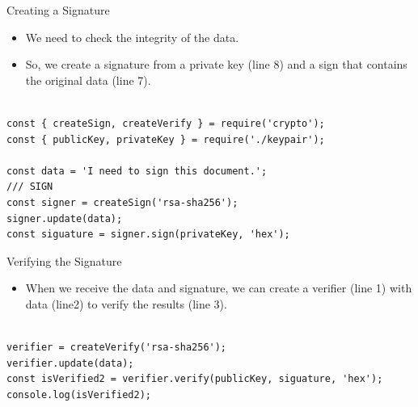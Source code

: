 \begin{frame}[fragile]{Creating a Signature}

\begin{itemize}
	\item We need to check the integrity of the data.
	\item So, we create a signature from a private key (line 8) and a sign that contains the original data (line 7).  
\end{itemize}

\begin{Code}{}%
\begin{lstlisting}[firstnumber=1, label=glabels, xleftmargin=0pt, basicstyle=\scriptsize]% 

const { createSign, createVerify } = require('crypto');
const { publicKey, privateKey } = require('./keypair');

const data = 'I need to sign this document.';
/// SIGN
const signer = createSign('rsa-sha256');
signer.update(data);
const siguature = signer.sign(privateKey, 'hex');
\end{lstlisting}%
\end{Code}%

\end{frame}

\begin{frame}[fragile]{Verifying the Signature}

\begin{itemize}
	\item When we receive the data and signature, we can create a verifier (line 1) with data (line2) to verify the results (line 3). 
\end{itemize}

\begin{Code}{}%
\begin{lstlisting}[firstnumber=1, label=glabels, xleftmargin=0pt, basicstyle=\scriptsize]% 

verifier = createVerify('rsa-sha256');
verifier.update(data);
const isVerified2 = verifier.verify(publicKey, siguature, 'hex');
console.log(isVerified2);
\end{lstlisting}%
\end{Code}%

\end{frame}